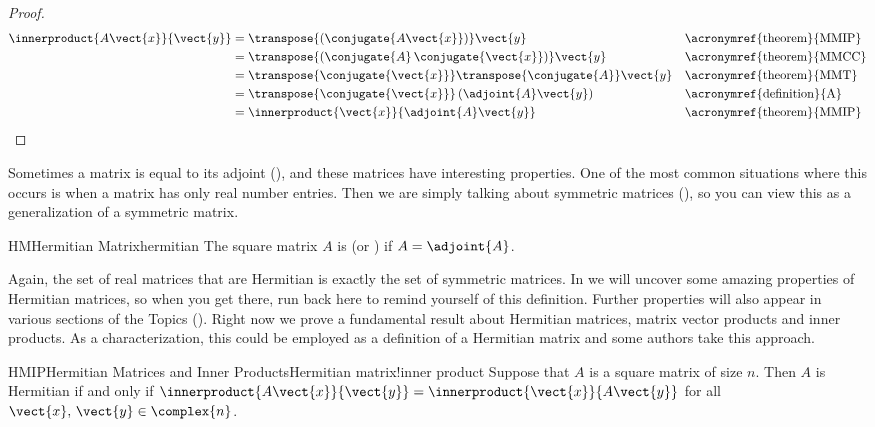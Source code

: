 %
\begin{proof}
%
\begin{align*}
\innerproduct{A\vect{x}}{\vect{y}}
&=\transpose{\left(\conjugate{A\vect{x}}\right)}\vect{y}
&&\text{\acronymref{theorem}{MMIP}}\\
&=\transpose{\left(\conjugate{A}\,\conjugate{\vect{x}}\right)}\vect{y}
&&\text{\acronymref{theorem}{MMCC}}\\
&=\transpose{\conjugate{\vect{x}}}\transpose{\conjugate{A}}\vect{y}
&&\text{\acronymref{theorem}{MMT}}\\
&=\transpose{\conjugate{\vect{x}}}\left(\adjoint{A}\vect{y}\right)
&&\text{\acronymref{definition}{A}}\\
&=\innerproduct{\vect{x}}{\adjoint{A}\vect{y}}
&&\text{\acronymref{theorem}{MMIP}}
\end{align*}
%
\end{proof}
%
Sometimes a matrix is equal to its adjoint (), and these matrices have interesting properties.  One of the most common situations where this occurs is when a matrix has only real number entries.  Then we are simply talking about symmetric matrices (), so you can view this as a generalization of a symmetric matrix.
%
\begin{definition}{HM}{Hermitian Matrix}{hermitian}
The square matrix $A$ is  (or ) if $A=\adjoint{A}$.
\end{definition}
%
Again, the set of real matrices that are Hermitian is exactly the set of symmetric matrices.  In  we will uncover some amazing properties of Hermitian matrices, so when you get there, run back here  to remind yourself of this definition.  Further properties will also appear in various sections of the Topics ().  Right now we prove a fundamental result about Hermitian matrices, matrix vector products and inner products.  As a characterization, this could be employed as a definition of a Hermitian matrix and some authors take this approach.\par
%
%
\begin{theorem}{HMIP}{Hermitian Matrices and Inner Products}{Hermitian matrix!inner product}
Suppose that $A$ is a square matrix of size $n$.  Then $A$ is Hermitian if and only if $\innerproduct{A\vect{x}}{\vect{y}}=\innerproduct{\vect{x}}{A\vect{y}}$ for all $\vect{x},\,\vect{y}\in\complex{n}$.
\end{theorem}
%
